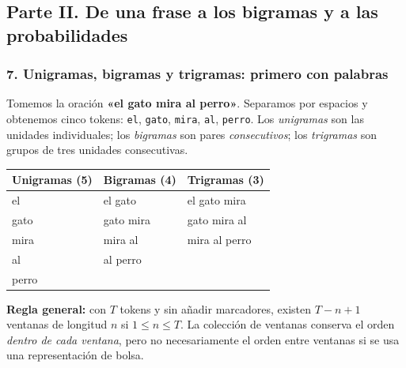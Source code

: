 

\subsection{Parte II. De una frase a los bigramas y a las probabilidades}

\subsubsection*{7. Unigramas, bigramas y trigramas: primero con palabras}
Tomemos la oración \textbf{«el gato mira al perro»}. Separamos por espacios y obtenemos cinco tokens: \texttt{el}, \texttt{gato}, \texttt{mira}, \texttt{al}, \texttt{perro}. Los \emph{unigramas} son las unidades individuales; los \emph{bigramas} son pares \emph{consecutivos}; los \emph{trigramas} son grupos de tres unidades consecutivas.
\begin{center}
\end{center}
\begin{center}
\begin{tabular}{lll}\toprule
Unigramas (5) & Bigramas (4) & Trigramas (3)\\\midrule
el & el gato & el gato mira\\
gato & gato mira & gato mira al\\
mira & mira al & mira al perro\\
al & al perro & \\
perro & & \\\bottomrule
\end{tabular}
\end{center}
\noindent\textbf{Regla general:} con $T$ tokens y sin añadir marcadores, existen $T-n+1$ ventanas de longitud $n$ si $1\le n\le T$. La colección de ventanas conserva el orden \emph{dentro de cada ventana}, pero no necesariamente el orden entre ventanas si se usa una representación de bolsa.


